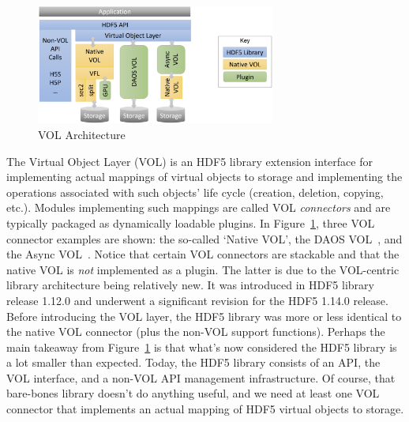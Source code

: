 \begin{figure}[h]
\centering
\includegraphics[width=0.7\textwidth]{images/VOL_arch.png}
\caption{VOL Architecture}
\label{fig:vol-arch}
\end{figure}

The Virtual Object Layer (VOL) is an HDF5 library extension interface for implementing actual mappings of virtual objects to storage and implementing the operations associated with such objects' life cycle (creation, deletion, copying, etc.). Modules implementing such mappings are called VOL \textit{connectors} and are typically packaged as dynamically loadable plugins. In Figure~\ref{fig:vol-arch}, three VOL connector examples are shown: the so-called `Native VOL', the DAOS VOL~\cite{soumagne2021}, and the Async VOL~\cite{tang2020}. Notice that certain VOL connectors are stackable and that the native VOL is \textit{not} implemented as a plugin. The latter is due to the VOL-centric library architecture being relatively new. It was introduced in HDF5 library release 1.12.0 and underwent a significant revision for the HDF5 1.14.0 release. Before introducing the VOL layer, the HDF5 library was more or less identical to the native VOL connector (plus the non-VOL support functions). Perhaps the main takeaway from Figure~\ref{fig:vol-arch} is that what's now considered the HDF5 library is a lot smaller than expected. Today, the HDF5 library consists of an API, the VOL interface, and a non-VOL API management infrastructure. Of course, that bare-bones library doesn't do anything useful, and we need at least one VOL connector that implements an actual mapping of HDF5 virtual objects to storage.

